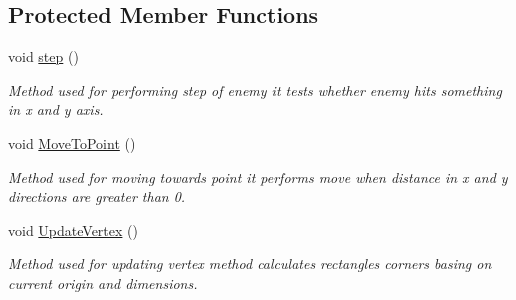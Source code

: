 \subsection*{Protected Member Functions}
\begin{DoxyCompactItemize}
\item 
\mbox{\label{class_enemy_designer_ac9518d4725dc0c6bfe65dcdefa72f67e}} 
void \mbox{\hyperlink{class_enemy_designer_ac9518d4725dc0c6bfe65dcdefa72f67e}{step}} ()
\begin{DoxyCompactList}\small\item\em Method used for performing step of enemy it tests whether enemy hits something in x and y axis. \end{DoxyCompactList}\item 
\mbox{\label{class_enemy_designer_a7148adb40736b887e9b9bd5cd5587e7a}} 
void \mbox{\hyperlink{class_enemy_designer_a7148adb40736b887e9b9bd5cd5587e7a}{Move\+To\+Point}} ()
\begin{DoxyCompactList}\small\item\em Method used for moving towards point it performs move when distance in x and y directions are greater than 0. \end{DoxyCompactList}\item 
\mbox{\label{class_enemy_designer_a856d62edac7271e1c9031eae3e9e156c}} 
void \mbox{\hyperlink{class_enemy_designer_a856d62edac7271e1c9031eae3e9e156c}{Update\+Vertex}} ()
\begin{DoxyCompactList}\small\item\em Method used for updating vertex method calculates rectangle\textquotesingle{}s corners basing on current origin and dimensions. \end{DoxyCompactList}\end{DoxyCompactItemize}
